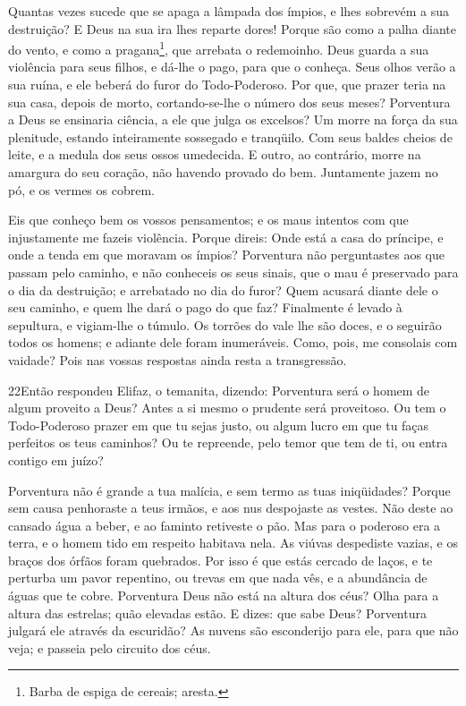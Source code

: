 Quantas vezes sucede que se apaga a lâmpada dos ímpios, e lhes
sobrevém a sua destruição? E Deus na sua ira lhes reparte dores!
Porque são como a palha diante do vento, e como a
pragana\footnote{Barba de espiga de cereais; aresta.}, que arrebata
o redemoinho. Deus guarda a sua violência para seus filhos, e
dá-lhe o pago, para que o conheça. Seus olhos verão a sua
ruína, e ele beberá do furor do Todo-Poderoso. Por que, que
prazer teria na sua casa, depois de morto, cortando-se-lhe o número
dos seus meses? Porventura a Deus se ensinaria ciência, a ele
que julga os excelsos? Um morre na força da sua plenitude,
estando inteiramente sossegado e tranqüilo. Com seus baldes
cheios de leite, e a medula dos seus ossos umedecida. E
outro, ao contrário, morre na amargura do seu coração, não havendo
provado do bem. Juntamente jazem no pó, e os vermes os
cobrem.

Eis que conheço bem os vossos pensamentos; e os maus intentos com
que injustamente me fazeis violência. Porque direis: Onde
está a casa do príncipe, e onde a tenda em que moravam os ímpios?
Porventura não perguntastes aos que passam pelo caminho, e
não conheceis os seus sinais, que o mau é preservado para o
dia da destruição; e arrebatado no dia do furor? Quem acusará
diante dele o seu caminho, e quem lhe dará o pago do que faz?
Finalmente é levado à sepultura, e vigiam-lhe o túmulo.
Os torrões do vale lhe são doces, e o seguirão todos os
homens; e adiante dele foram inumeráveis. Como, pois, me
consolais com vaidade? Pois nas vossas respostas ainda resta a
transgressão.

\medskip

\lettrine{22} Então respondeu Elifaz, o temanita, dizendo:
Porventura será o homem de algum proveito a Deus? Antes a si
mesmo o prudente será proveitoso. Ou tem o Todo-Poderoso prazer
em que tu sejas justo, ou algum lucro em que tu faças perfeitos os
teus caminhos? Ou te repreende, pelo temor que tem de ti, ou
entra contigo em juízo?

Porventura não é grande a tua malícia, e sem termo as tuas
iniqüidades? Porque sem causa penhoraste a teus irmãos, e aos
nus despojaste as vestes. Não deste ao cansado água a beber, e
ao faminto retiveste o pão. Mas para o poderoso era a terra, e o
homem tido em respeito habitava nela. As viúvas despediste
vazias, e os braços dos órfãos foram quebrados. Por isso é
que estás cercado de laços, e te perturba um pavor repentino,
ou trevas em que nada vês, e a abundância de águas que te
cobre. Porventura Deus não está na altura dos céus? Olha para
a altura das estrelas; quão elevadas estão. E dizes: que sabe
Deus? Porventura julgará ele através da escuridão? As nuvens
são esconderijo para ele, para que não veja; e passeia pelo circuito
dos céus.

